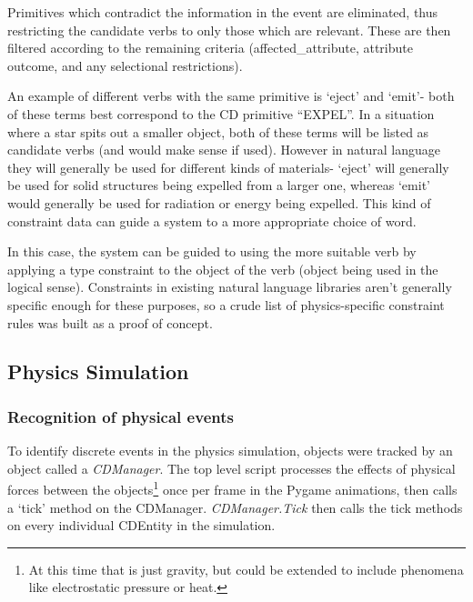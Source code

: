 \documentclass[dissertation.tex]{subfiles}
\begin{document}

    Primitives which contradict the information in the event are eliminated, thus restricting the candidate verbs to only those which are relevant. These are then filtered according to the remaining criteria (affected\_attribute, attribute outcome, and any selectional restrictions).

    An example of different verbs with the same primitive is `eject' and `emit'- both of these terms best correspond to the CD primitive ``EXPEL''. In a situation where a star spits out a smaller object, both of these terms will be listed as candidate verbs (and would make sense if used). However in natural language they will generally be used for different kinds of materials- `eject' will generally be used for solid structures being expelled from a larger one, whereas `emit' would generally be used for radiation or energy being expelled. This kind of constraint data can guide a system to a more appropriate choice of word.

    In this case, the system can be guided to using the more suitable verb by applying a type constraint to the object of the verb (object being used in the logical sense). Constraints in existing natural language libraries aren't generally specific enough for these purposes, so a crude list of physics-specific constraint rules was built as a proof of concept.

    \subsection{Physics Simulation}
    \subsubsection{Recognition of physical events}
    To identify discrete events in the physics simulation, objects were tracked by an object called a \textit{CDManager}. The top level script processes the effects of physical forces between the objects\footnote{At this time that is just gravity, but could be extended to include phenomena like electrostatic pressure or heat.} once per frame in the Pygame animations, then calls a `tick' method on the CDManager. \textit{CDManager.Tick} then calls the tick methods on every individual CDEntity in the simulation.

\lstset{language=Python,basicstyle=\footnotesize,}
\end{document}
